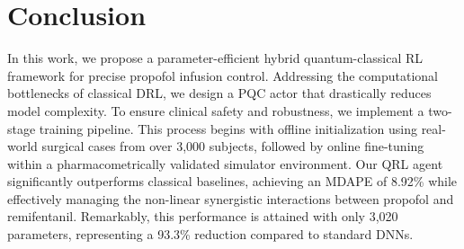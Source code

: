 \documentclass[pdflatex,sn-mathphys-num]{sn-jnl}%
\theoremstyle{thmstyleone}%
\theoremstyle{thmstyletwo}%
\theoremstyle{thmstylethree}%
\begin{document}
\section{Conclusion} \label{sec:6}
In this work, we propose a parameter-efficient hybrid quantum-classical RL framework for precise propofol infusion control. Addressing the computational bottlenecks of classical DRL, we design a PQC actor that drastically reduces model complexity. To ensure clinical safety and robustness, we implement a two-stage training pipeline. This process begins with offline initialization using real-world surgical cases from over 3,000 subjects, followed by online fine-tuning within a pharmacometrically validated simulator environment.
Our QRL agent significantly outperforms classical baselines, achieving an MDAPE of 8.92\% while effectively managing the non-linear synergistic interactions between propofol and remifentanil. Remarkably, this performance is attained with only 3,020 parameters, representing a 93.3\% reduction compared to standard DNNs.


\end{document}
